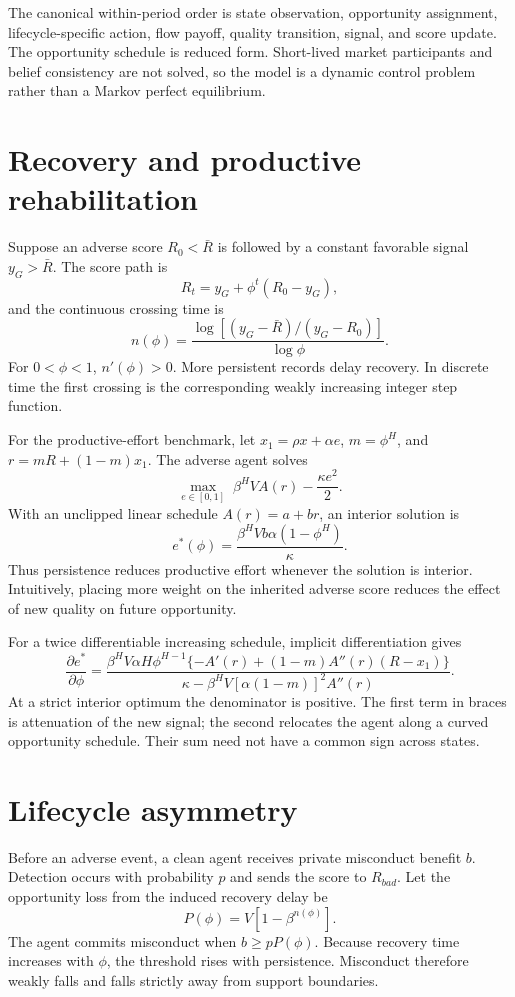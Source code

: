 \documentclass[11pt]{article}
\begin{document}
The canonical within-period order is state observation, opportunity assignment, lifecycle-specific action, flow payoff, quality transition, signal, and score update. The opportunity schedule is reduced form. Short-lived market participants and belief consistency are not solved, so the model is a dynamic control problem rather than a Markov perfect equilibrium.

\section{Recovery and productive rehabilitation}

Suppose an adverse score $R_0<\bar R$ is followed by a constant favorable signal $y_G>\bar R$. The score path is
\[
R_t=y_G+\phi^t(R_0-y_G),
\]
and the continuous crossing time is
\[
n(\phi)=\frac{\log[(y_G-\bar R)/(y_G-R_0)]}{\log\phi}.
\]
For $0<\phi<1$, $n'(\phi)>0$. More persistent records delay recovery. In discrete time the first crossing is the corresponding weakly increasing integer step function.

For the productive-effort benchmark, let $x_1=\rho x+\alpha e$, $m=\phi^H$, and $r=mR+(1-m)x_1$. The adverse agent solves
\[
\max_{e\in[0,1]}\;\beta^H V A(r)-\frac{\kappa e^2}{2}.
\]
With an unclipped linear schedule $A(r)=a+br$, an interior solution is
\[
e^*(\phi)=\frac{\beta^H Vb\alpha(1-\phi^H)}{\kappa}.
\]
Thus persistence reduces productive effort whenever the solution is interior. Intuitively, placing more weight on the inherited adverse score reduces the effect of new quality on future opportunity.

For a twice differentiable increasing schedule, implicit differentiation gives
\begin{equation}
\frac{\partial e^*}{\partial\phi}=
\frac{\beta^H V\alpha H\phi^{H-1}\{-A'(r)+(1-m)A''(r)(R-x_1)\}}
{\kappa-\beta^H V[\alpha(1-m)]^2A''(r)}.
\label{eq:effortphi}
\end{equation}
At a strict interior optimum the denominator is positive. The first term in braces is attenuation of the new signal; the second relocates the agent along a curved opportunity schedule. Their sum need not have a common sign across states.

\section{Lifecycle asymmetry}

Before an adverse event, a clean agent receives private misconduct benefit $b$. Detection occurs with probability $p$ and sends the score to $R_{bad}$. Let the opportunity loss from the induced recovery delay be
\[
P(\phi)=V[1-\beta^{n(\phi)}].
\]
The agent commits misconduct when $b\geq pP(\phi)$. Because recovery time increases with $\phi$, the threshold rises with persistence. Misconduct therefore weakly falls and falls strictly away from support boundaries.
\end{document}
